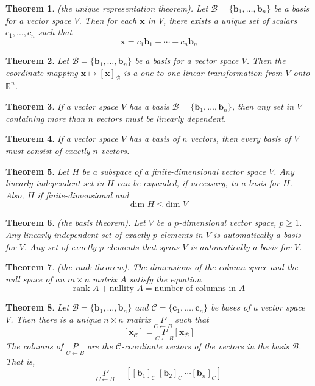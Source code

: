 \documentclass{article}
\theoremstyle{plain}
\newtheorem{thm}{Theorem}[section]
\theoremstyle{definition}
\theoremstyle{remark}
\begin{document}
\begin{thm} (the unique representation theorem).
    Let \(\mathcal{B}=\{\textbf{b}_1,\ldots,\textbf{b}_n\}\) be a basis for a vector space \(V\). Then for each \(\textbf{x}\) in \(V\), there exists a unique set of scalars \(c_1,\ldots,c_n\) such that \[\textbf{x}=c_1\textbf{b}_1+\cdots+c_n\textbf{b}_n\]
\end{thm}

\begin{thm}
    Let \(\mathcal{B}=\{\textbf{b}_1,\ldots,\textbf{b}_n\}\) be a basis for a vector space \(V\). Then the coordinate mapping \(\textbf{x}\mapsto\left[\textbf{x}\right]_{\mathcal{B}}\) is a one-to-one linear transformation from \(V\) onto \(\mathbb{R}^n\).
\end{thm}

\begin{thm}
    If a vector space \(V\) has a basis \(\mathcal{B}=\{\textbf{b}_1,\ldots,\textbf{b}_n\}\), then any set in \(V\) containing more than \(n\) vectors must be linearly dependent.
\end{thm}

\begin{thm}
    If a vector space \(V\) has a basis of \(n\) vectors, then every basis of \(V\) must consist of exactly \(n\) vectors.
\end{thm}

\begin{thm}
    Let \(H\) be a subspace of a finite-dimensional vector space \(V\). Any linearly independent set in \(H\) can be expanded, if necessary, to a basis for \(H\). Also, \(H\) if finite-dimensional and \[\text{dim } H\leq\text{dim }V\]
\end{thm}

\begin{thm} (the basis theorem).
    Let \(V\) be a \(p\)-dimensional vector space, \(p\geq1\). Any linearly independent set of exactly \(p\) elements in \(V\) is automatically a basis for \(V\). Any set of exactly \(p\) elements that spans \(V\) is automatically a basis for \(V\).
\end{thm}

\begin{thm} (the rank theorem).
    The dimensions of the column space and the null space of an \(m\times n\) matrix \(A\) satisfy the equation \[\text{rank }A+\text{nullity }A=\text{number of columns in }A\] 
\end{thm}

\begin{thm}
    Let \(\mathcal{B}=\{\textbf{b}_1,\ldots,\textbf{b}_n\}\) and \(\mathcal{C}=\{\textbf{c}_1,\ldots,\textbf{c}_n\}\) be bases of a vector space \(V\). Then there is a unique \(n\times n\) matrix \(\underset{C\leftarrow B}{P}\) such that \[\left[\textbf{x}_\mathcal{C}\right]=\underset{C\leftarrow B}{P}\left[\textbf{x}_\mathcal{B}\right]\] The columns of \(\underset{C \leftarrow B}{P}\) are the \(\mathcal{C}\)-coordinate vectors of the vectors in the basis \(\mathcal{B}\). That is, \[\underset{C\leftarrow B}{P}=\left[\left[\textbf{b}_1\right]_\mathcal{C}\ \left[\textbf{b}_2\right]_\mathcal{C}\ \cdots \left[\textbf{b}_n\right]_\mathcal{C}\right]\]
\end{thm}
\end{document}
